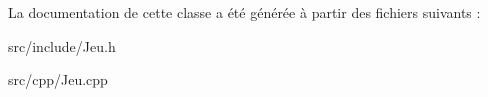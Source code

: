 La documentation de cette classe a été générée à partir des fichiers suivants \+:\begin{DoxyCompactItemize}
\item 
src/include/Jeu.\+h\item 
src/cpp/Jeu.\+cpp\end{DoxyCompactItemize}
